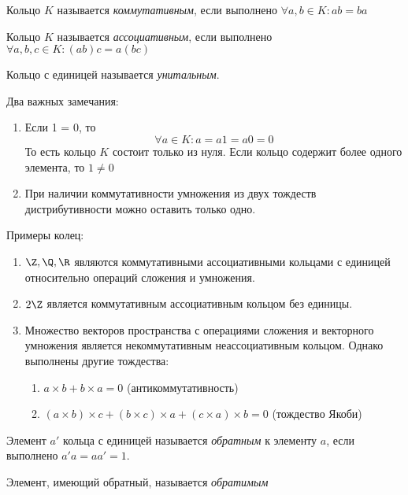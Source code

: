\documentclass[a4paper, 14pt]{article}
\begin{document}
    \begin{definition}
        Кольцо $K$ называется {\it коммутативным}, если выполнено $\forall a, b \in K : ab = ba$
    \end{definition}
    \begin{definition}
        Кольцо $K$ называется {\it ассоциативным}, если выполнено $\forall a, b, c \in K : (ab)c = a(bc)$
    \end{definition}
    \begin{definition}
        Кольцо с единицей называется {\it  унитальным}.
    \end{definition}
    Два важных замечания:
    \begin{enumerate}
        \item Если 1 = 0, то
        \[\forall a \in K : a = a1 = a0 = 0\]
        То есть кольцо $K$ состоит только из нуля. Если кольцо содержит более одного элемента, то $1 \neq 0$

        \item При наличии коммутативности умножения из двух тождеств дистрибутивности
        можно оставить только одно.
    \end{enumerate}

    Примеры колец:
    \begin{enumerate}
        \item $\Z, \Q, \R$ являются коммутативными ассоциативными кольцами с единицей
        относительно операций сложения и умножения.
        \item $2\Z$ является коммутативным ассоциативным кольцом без единицы.
        \item Множество векторов пространства с операциями сложения и векторного умножения
        является некоммутативным неассоциативным кольцом. Однако выполнены другие тождества:
        \begin{enumerate}
            \item $a \times b + b \times a = 0$ (антикоммутативность)
            \item $(a \times b) \times c + (b \times c) \times a + (c \times a) \times b = 0$ (тождество Якоби)
        \end{enumerate} 
    \end{enumerate}
    
    \begin{definition}
        Элемент $a'$ кольца с единицей называется {\it обратным} к элементу $a$,
        если выполнено $a'a = aa' = 1$.

        Элемент, имеющий обратный, называется {\it обратимым}
    \end{definition}
\end{document}
